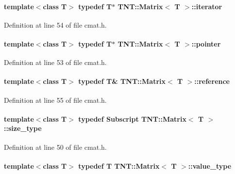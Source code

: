 \paragraph[{iterator}]{\setlength{\rightskip}{0pt plus 5cm}template$<$class T$>$ typedef T$\ast$ {\bf TNT::Matrix}$<$ T $>$::{\bf iterator}}\hfill\label{class_t_n_t_1_1_matrix_a8233a1d03d4cfeab1d7cfec560cd2f0c}


Definition at line 54 of file cmat.h.

\paragraph[{pointer}]{\setlength{\rightskip}{0pt plus 5cm}template$<$class T$>$ typedef T$\ast$ {\bf TNT::Matrix}$<$ T $>$::{\bf pointer}}\hfill\label{class_t_n_t_1_1_matrix_aa7db7adc5513f7d8bf067965b97d7c42}


Definition at line 53 of file cmat.h.

\paragraph[{reference}]{\setlength{\rightskip}{0pt plus 5cm}template$<$class T$>$ typedef T\& {\bf TNT::Matrix}$<$ T $>$::{\bf reference}}\hfill\label{class_t_n_t_1_1_matrix_a129951783800dd85d3dcc1f6dd2062f9}


Definition at line 55 of file cmat.h.

\paragraph[{size\_\-type}]{\setlength{\rightskip}{0pt plus 5cm}template$<$class T$>$ typedef {\bf Subscript} {\bf TNT::Matrix}$<$ T $>$::{\bf size\_\-type}}\hfill\label{class_t_n_t_1_1_matrix_a42f57fd19de0ba2edce3734f41431727}


Definition at line 50 of file cmat.h.

\paragraph[{value\_\-type}]{\setlength{\rightskip}{0pt plus 5cm}template$<$class T$>$ typedef T {\bf TNT::Matrix}$<$ T $>$::{\bf value\_\-type}}\hfill\label{class_t_n_t_1_1_matrix_a869b1a3e56a38bdaeb0b4f698b08e3c5}



